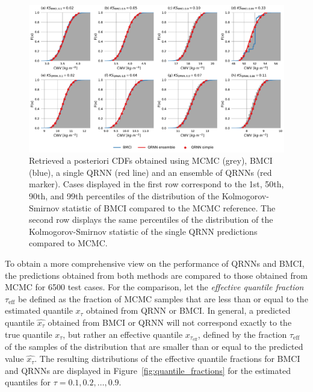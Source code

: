 \documentclass[journal abbreviation, manuscript]{copernicus}
\begin{document}
  \begin{figure}[hbpt!]
    \centering
    \includegraphics[width = 1.0\linewidth]{../plots/posterior_cdfs}
    \caption{Retrieved a posteriori CDFs obtained using MCMC (grey), BMCI
    (blue), a single QRNN (red line) and an ensemble of QRNNs (red marker). Cases
    displayed in the first row correspond to the 1st, 50th, 90th, and 99th
    percentiles of the distribution of the Kolmogorov-Smirnov statistic of BMCI
    compared to the MCMC reference. The second row displays the same percentiles of
    the distribution of the Kolmogorov-Smirnov statistic of the single QRNN
    predictions compared to MCMC.}
    \label{fig:cdfs}
  \end{figure}

    To obtain a more comprehensive view on the performance of QRNNs and BMCI,
the predictions obtained from both methods are compared to those obtained from
MCMC for 6500 test cases. For the comparison, let the
\textit{effective quantile fraction} $\tau_{\text{eff}}$ be defined as the
fraction of MCMC samples that are less than or equal to the estimated quantile
$x_\tau$ obtained from QRNN or BMCI. In general, a predicted quantile $\widehat{x_\tau}$
obtained from BMCI or QRNN will not correspond exactly to the true
quantile $x_\tau$, but rather an effective quantile $x_{\tau_\text{eff}}$,
defined by the fraction $\tau_\text{eff}$ of the samples of the distribution
that are smaller than or equal to the predicted value $\widehat{x_\tau}$. The resulting
distributions of the effective quantile fractions for BMCI and QRNNs are
displayed in Figure~\ref{fig:quantile_fractions} for the estimated quantiles for
$\tau = 0.1, 0.2, \ldots, 0.9$.
\end{document}
